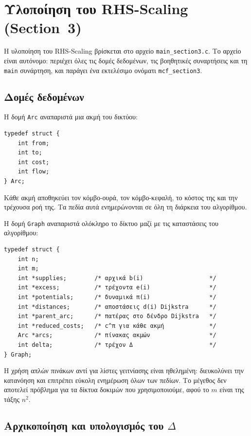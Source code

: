 \documentclass[11pt,a4paper,oneside]{report}
\let\oldsubsection\subsection
\renewcommand{\subsection}{\FloatBarrier\oldsubsection}
\begin{document}
\section{Υλοποίηση του \textenglish{RHS-Scaling} (\textenglish{Section~3})}

Η υλοποίηση του \textenglish{RHS-Scaling} βρίσκεται στο αρχείο \texttt{main\_section3.c}. Το αρχείο είναι αυτόνομο: περιέχει όλες τις δομές δεδομένων, τις βοηθητικές συναρτήσεις και τη \texttt{main} συνάρτηση, και παράγει ένα εκτελέσιμο ονόματι \texttt{mcf\_section3}.

\subsection{Δομές δεδομένων}

Η δομή \texttt{Arc} αναπαριστά μια ακμή του δικτύου:

\begin{verbatim}
typedef struct {
    int from;
    int to;
    int cost;
    int flow;
} Arc;
\end{verbatim}

Κάθε ακμή αποθηκεύει τον κόμβο-ουρά, τον κόμβο-κεφαλή, το κόστος της και την τρέχουσα ροή της. Τα πεδία αυτά ενημερώνονται σε όλη τη διάρκεια του αλγορίθμου.

Η δομή \texttt{Graph} αναπαριστά ολόκληρο το δίκτυο μαζί με τις καταστάσεις του αλγορίθμου:

\begin{verbatim}
typedef struct {
    int n;
    int m;
    int *supplies;        /* αρχικά b(i)                   */
    int *excess;          /* τρέχοντα e(i)                 */
    int *potentials;      /* δυναμικά π(i)                 */
    int *distances;       /* αποστάσεις d(i) Dijkstra      */
    int *parent_arc;      /* πατέρας στο δένδρο Dijkstra   */
    int *reduced_costs;   /* c^π για κάθε ακμή             */
    Arc *arcs;            /* πίνακας ακμών                 */
    int delta;            /* τρέχον Δ                      */
} Graph;
\end{verbatim}

Η χρήση απλών πινάκων αντί για λίστες γειτνίασης είναι ηθελημένη: διευκολύνει την κατανόηση και επιτρέπει εύκολη ενημέρωση όλων των πεδίων. Το μέγεθος δεν αποτελεί πρόβλημα για τα δίκτυα δοκιμών που χρησιμοποιούμε, αφού το $m$ είναι της τάξης $n^2$.

\subsection{Αρχικοποίηση και υπολογισμός του $\Delta$}
\end{document}
